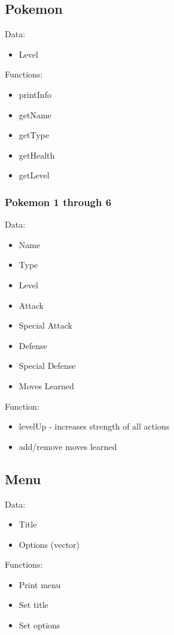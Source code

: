 \documentclass{article}
\begin{document}
\begin{multicols}{2}
    \subsection{Pokemon}
    Data:
    \begin{itemize}
      \item Level
    \end{itemize}
    Functions:
    \begin{itemize}
      \item printInfo
      \item getName
      \item getType
      \item getHealth
      \item getLevel
    \end{itemize}
    
    \subsubsection{Pokemon 1 through 6}
    Data:
      \begin{itemize}
        \item Name
        \item Type
        \item Level
        \item Attack
        \item Special Attack
        \item Defense
        \item Special Defense
        \item Moves Learned
      \end{itemize}
    Function:
      \begin{itemize}
        \item levelUp - increases strength of all actions
        \item add/remove moves learned
      \end{itemize}
    
    \subsection{Menu}
    Data:
    \begin{itemize}
      \item Title
      \item Options (vector)
    \end{itemize}
    Functions:
    \begin{itemize}
      \item Print menu
      \item Set title
      \item Set options
    \end{itemize}
    \end{multicols}
  
\end{document}

